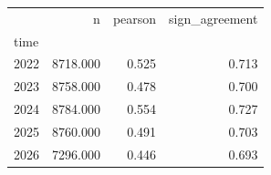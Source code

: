 \begin{tabular}{lrrr}
\toprule
 & n & pearson & sign_agreement \\
time &  &  &  \\
\midrule
2022 & 8718.000 & 0.525 & 0.713 \\
2023 & 8758.000 & 0.478 & 0.700 \\
2024 & 8784.000 & 0.554 & 0.727 \\
2025 & 8760.000 & 0.491 & 0.703 \\
2026 & 7296.000 & 0.446 & 0.693 \\
\bottomrule
\end{tabular}

